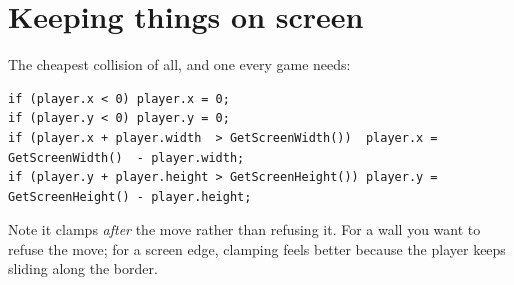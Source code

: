 \section{Keeping things on screen}

The cheapest collision of all, and one every game needs:

\begin{lstlisting}
if (player.x < 0) player.x = 0;
if (player.y < 0) player.y = 0;
if (player.x + player.width  > GetScreenWidth())  player.x = GetScreenWidth()  - player.width;
if (player.y + player.height > GetScreenHeight()) player.y = GetScreenHeight() - player.height;
\end{lstlisting}

Note it clamps \emph{after} the move rather than refusing it. For a wall you want
to refuse the move; for a screen edge, clamping feels better because the player
keeps sliding along the border.


